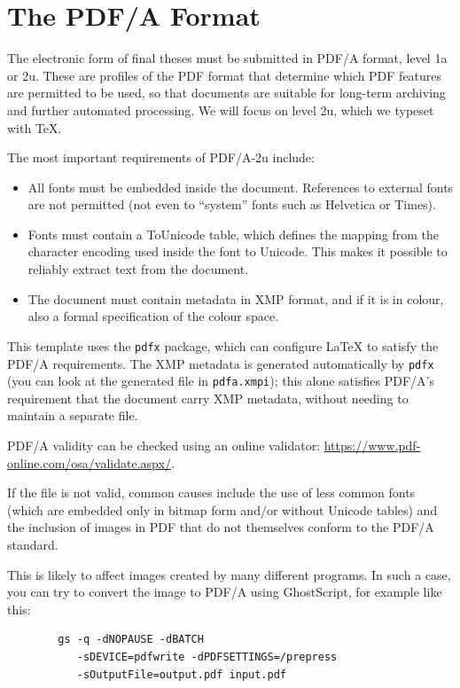 
\chapter{The PDF/A Format}\label{chap:pdfa}

The electronic form of final theses
must be submitted in PDF/A format, level 1a or 2u. These are
profiles of the PDF format that determine which PDF features are permitted
to be used, so that documents are suitable for long-term archiving and
further automated processing. We will focus on level 2u, which we typeset with \TeX.

The most important requirements of PDF/A-2u include:

\begin{itemize}

\item All fonts must be embedded inside the document. References to
external fonts are not permitted (not even to \enquote{system} fonts such as Helvetica or Times).

\item Fonts must contain a ToUnicode table, which defines the mapping from the
character encoding used inside the font to Unicode. This makes it
possible to reliably extract text from the document.

\item The document must contain metadata in XMP format, and if it is in
colour, also a formal specification of the colour space.

\end{itemize}

This template uses the {\tt pdfx} package, which can configure \LaTeX{}
to satisfy the PDF/A requirements. The XMP metadata is generated automatically by
{\tt pdfx} (you can look at the generated file in {\tt pdfa.xmpi}); this
alone satisfies PDF/A's requirement that the document carry XMP metadata,
without needing to maintain a separate file.

PDF/A validity can be checked using an online validator: \url{https://www.pdf-online.com/osa/validate.aspx/}.

If the file is not valid, common causes include the use of less common
fonts (which are embedded only in bitmap form and/or without Unicode
tables) and the inclusion of images in PDF that do not themselves conform to
the PDF/A standard.

This is likely to affect images created by many different programs.
In such a case, you can try to convert the image to PDF/A using
GhostScript, for example like this:

\begin{verbatim}
        gs -q -dNOPAUSE -dBATCH
           -sDEVICE=pdfwrite -dPDFSETTINGS=/prepress
           -sOutputFile=output.pdf input.pdf
\end{verbatim}
